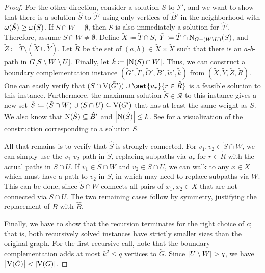 \begin{theorem}
\begin{lemma}
\begin{theorem}
\begin{lemma}
\begin{reduction*}
\begin{reduction*}
\begin{reduction*}
\begin{reduction*}
\begin{lemma}
\begin{lemma}
\begin{theorem}
\begin{proof}
  For the other direction, consider a solution $S$ to $\mathcal{I}'$, and we want to show that there is a solution $\hat{S}$ to $\hat{\mathcal{I}}'$ using only vertices of $\hat{B}'$ in the neighborhood with $\operatorname{\omega}({\hat{S}}) \ge \operatorname{\omega}({S})$. If $S \cap W = \emptyset$, then $S$ is also immediately a solution for $\hat{\mathcal{I}}'$. Therefore, assume $S \cap W \ne \emptyset$. Define $\tilde{X} \coloneqq \tilde{T} \cap S$, $\tilde{Y} \coloneqq \tilde{T} \cap \operatorname{N}_{G - (W\setminus U)}({S})$, and $\tilde{Z} \coloneqq \tilde{T} \setminus (\tilde{X} \cup \tilde{Y})$. Let $\tilde{R}$ be the set of $(a,b) \in \tilde{X} \times \tilde{X}$ such that there is an $a$-$b$-path in ${G}[{S \setminus {W \setminus U}}]$. Finally, let $\tilde{k} \coloneqq \abs{\nei{S} \cap W}$. Thus, we can construct a boundary complementation instance $(\tilde{G}', \tilde{I}', \tilde{O}', \tilde{B}', \tilde{w}', \tilde{k})$ from $(\tilde{X}, \tilde{Y}, \tilde{Z}, \tilde{R})$. One can easily verify that $(S \cap \ve{\tilde{G}'}) \cup \set{u_r}{r \in \tilde{R}}$ is a feasible solution to this instance. Furthermore, the maximum solution $\tilde{S} \in \mathcal{R}$ to this instance gives a new set $\hat{S} \coloneqq (\tilde{S} \cap W) \cup (S \cap U) \subseteq \operatorname{V}({G'})$ that has at least the same weight as $S$. We also know that $\operatorname{N}({\hat{S}}) \subseteq \hat{B}'$ and $\abs{\nei{\hat{S}}} \le k$. See  for a visualization of the construction corresponding to a solution $S$.


  All that remains is to verify that $\hat{S}$ is strongly connected. For $v_1, v_2 \in \tilde{S} \cap W$, we can simply use the $v_1$-$v_2$-path in $\tilde{S}$, replacing subpaths via $u_r$ for $r \in \tilde{R}$ with the actual paths in $S \cap U$. If $v_1 \in \tilde{S} \cap W$ and $v_2 \in S \cap U$, we can walk to any $x \in \tilde{X}$ which must have a path to $v_2$ in $S$, in which may need to replace subpaths via $W$. This can be done, since $\tilde{S} \cap W$ connects all pairs of $x_1, x_2 \in X$ that are not connected via $S \cap U$. The two remaining cases follow by symmetry, justifying the replacement of $B$ with $\hat{B}$.

  Finally, we have to show that the recursion terminates for the right choice of $c$; that is, both recursively solved instances have strictly smaller sizes than the original graph.
  For the first recursive call, note that the boundary complementation adds at most $k^2 \le q$ vertices to $\tilde{G}$. Since $\abs{U \setminus W} > q$, we have $\abs{\ve{\tilde{G}}} < \abs{\ve{G}}$.


\end{proof}
\end{theorem}
\end{lemma}
\end{lemma}
\end{reduction*}
\end{reduction*}
\end{reduction*}
\end{reduction*}
\end{lemma}
\end{theorem}
\end{lemma}
\end{theorem}
